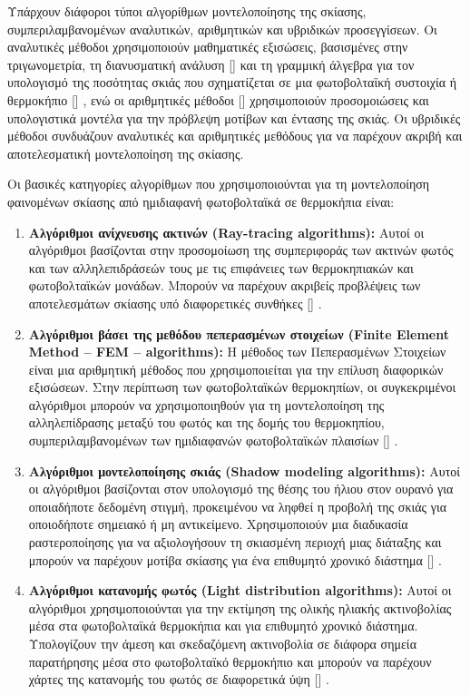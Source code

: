 \documentclass[12pt, a4paper]{report} %
\DeclareRobustCommand{\lcitep}[1]{%
  \english{[\cite{#1}]}%
}
\newcommand{\english}{\foreignlanguage{english}}
\begin{document}
Υπάρχουν διάφοροι τύποι αλγορίθμων μοντελοποίησης της σκίασης, συμπεριλαμβανομένων αναλυτικών, αριθμητικών και 
υβριδικών προσεγγίσεων. Οι αναλυτικές μέθοδοι χρησιμοποιούν μαθηματικές εξισώσεις, βασισμένες στην τριγωνομετρία, 
τη διανυσματική ανάλυση \lcitep{algorithm_bib1} και τη γραμμική άλγεβρα για τον υπολογισμό της ποσότητας σκιάς που 
σχηματίζεται σε μια φωτοβολταϊκή συστοιχία ή θερμοκήπιο \lcitep{algorithm_bib2}, ενώ οι αριθμητικές μέθοδοι 
\lcitep{algorithm_bib3} χρησιμοποιούν προσομοιώσεις και υπολογιστικά μοντέλα για την πρόβλεψη μοτίβων και έντασης της 
σκιάς. Οι υβριδικές μέθοδοι συνδυάζουν αναλυτικές και αριθμητικές μεθόδους για να παρέχουν ακριβή και αποτελεσματική 
μοντελοποίηση της σκίασης.

Οι βασικές κατηγορίες αλγορίθμων που χρησιμοποιούνται για τη μοντελοποίηση φαινομένων σκίασης από ημιδιαφανή 
φωτοβολταϊκά σε θερμοκήπια είναι:

\begin{enumerate}
    \item \textbf{Αλγόριθμοι ανίχνευσης ακτινών (\english{Ray-tracing algorithms}):} Αυτοί οι αλγόριθμοι βασίζονται 
    στην προσομοίωση της συμπεριφοράς των ακτινών φωτός και των αλληλεπιδράσεών τους με τις επιφάνειες των θερμοκηπιακών 
    και φωτοβολταϊκών μονάδων. Μπορούν να παρέχουν ακριβείς προβλέψεις των αποτελεσμάτων σκίασης υπό διαφορετικές 
    συνθήκες \lcitep{algorithm_bib4,algorithm_bib5}.
    \item \textbf{Αλγόριθμοι βάσει της μεθόδου πεπερασμένων στοιχείων (\english{Finite Element Method – FEM – 
    algorithms}):} Η μέθοδος των Πεπερασμένων Στοιχείων είναι μια αριθμητική μέθοδος που χρησιμοποιείται για την 
    επίλυση διαφορικών εξισώσεων. Στην περίπτωση των φωτοβολταϊκών θερμοκηπίων, οι συγκεκριμένοι αλγόριθμοι μπορούν 
    να χρησιμοποιηθούν για τη μοντελοποίηση της αλληλεπίδρασης μεταξύ του φωτός και της δομής του θερμοκηπίου, 
    συμπεριλαμβανομένων των ημιδιαφανών φωτοβολταϊκών πλαισίων \lcitep{algorithm_bib6,algorithm_bib7,algorithm_bib8}.
    \item \textbf{Αλγόριθμοι μοντελοποίησης σκιάς (\english{Shadow modeling algorithms}):} Αυτοί οι αλγόριθμοι 
    βασίζονται στον υπολογισμό της θέσης του ήλιου στον ουρανό για οποιαδήποτε δεδομένη στιγμή, προκειμένου να 
    ληφθεί η προβολή της σκιάς για οποιοδήποτε σημειακό ή μη αντικείμενο. Χρησιμοποιούν μια διαδικασία ραστεροποίησης 
    για να αξιολογήσουν τη σκιασμένη περιοχή μιας διάταξης και μπορούν να παρέχουν μοτίβα σκίασης για ένα επιθυμητό 
    χρονικό διάστημα \lcitep{algorithm_bib9,algorithm_bib10}.
    \item \textbf{Αλγόριθμοι κατανομής φωτός (\english{Light distribution algorithms}):} Αυτοί οι αλγόριθμοι 
    χρησιμοποιούνται για την εκτίμηση της ολικής ηλιακής ακτινοβολίας μέσα στα φωτοβολταϊκά θερμοκήπια και για 
    επιθυμητό χρονικό διάστημα. Υπολογίζουν την άμεση και σκεδαζόμενη ακτινοβολία σε διάφορα σημεία παρατήρησης 
    μέσα στο φωτοβολταϊκό θερμοκήπιο και μπορούν να παρέχουν χάρτες της κατανομής του φωτός σε διαφορετικά ύψη 
    \lcitep{algorithm_bib11,algorithm_bib12}.
\end{enumerate}
\end{document}

